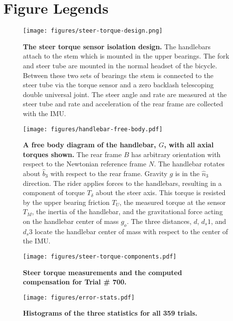 \documentclass[10pt]{article}
\begin{document}



\section*{Figure Legends}

\begin{figure}[!ht]
  \centering
  \texttt{[image: figures/steer-torque-design.png]}
  \caption{{\bf The steer torque sensor isolation design.} The handlebars attach to
    the stem which is mounted in the upper bearings. The fork and steer tube
    are mounted in the normal headset of the bicycle. Between these two sets of
    bearings the stem is connected to the steer tube via the torque sensor and a
    zero backlash telescoping double universal joint. The steer angle and rate
    are measured at the steer tube and rate and acceleration of the rear frame
    are collected with the IMU.}
  \label{fig:steer-torque-design}
\end{figure}

\begin{figure}[!ht]
  \centering
  \texttt{[image: figures/handlebar-free-body.pdf]}
  \caption{{\bf A free body diagram of the handlebar, $G$, with all axial torques
    shown.} The rear frame $B$ has arbitrary orientation with respect to the
    Newtonian reference frame $N$. The handlebar rotates about $\hat{b}_3$ with
    respect to the rear frame. Gravity $g$ is in the $\hat{n}_3$ direction. The
    rider applies forces to the handlebars, resulting in a component of torque
    $T_\delta$ about the steer axis. This torque is resisted by the upper
    bearing friction $T_U$, the measured torque at the sensor $T_M$, the
    inertia of the handlebar, and the gravitational force acting on the
    handlebar center of mass $g_o$. The three distances, $d$, $d_s1$, and
    $d_s3$ locate the handlebar center of mass with respect to the center of
    the IMU.}
  \label{fig:handlebar-free-body}
\end{figure}

\begin{figure}[!ht]
  \centering
  \texttt{[image: figures/steer-torque-components.pdf]}
  \caption{{\bf Steer torque measurements and the computed compensation for Trial \#
    700.}}
  \label{fig:steer-torque-components}
\end{figure}

\begin{figure}[!ht]
  \centering
  \texttt{[image: figures/error-stats.pdf]}
  \caption{{\bf Histograms of the three statistics for all 359 trials.}}
  \label{fig:error-stats}
\end{figure}
\end{document}
